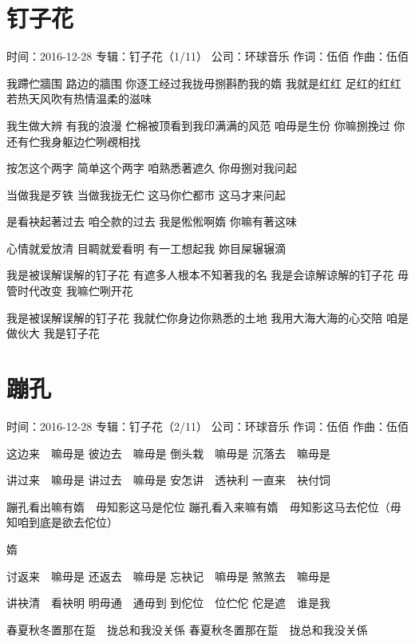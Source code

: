 \documentclass[UTF8,a4paper,oneside,twocolumn,12pt]{ctexbook}
\newcommand{\infopair}[2]{\textbullet #1：#2}
\newcommand{\zc}[1][伍佰]{\infopair{作词}{#1}}
\newcommand{\zq}[1][伍佰]{\infopair{作曲}{#1}}
\newcommand{\zj}[1]{\infopair{专辑}{#1}}
\newcommand{\sj}[1]{\infopair{时间}{#1}}
\newcommand{\gs}[1]{\infopair{公司}{#1}}
\newenvironment{info}{\begin{flushleft}\kaishu
	}
	{\end{flushleft}\normalsize\yahei\par}
\newenvironment{lyric}{
	}
{}
\begin{document}
\section{钉子花}
\begin{info}
	\sj{2016-12-28}
	\zj{钉子花（1/11）}
	\gs{环球音乐}
	\zc
	\zq
\end{info}
\begin{lyric}
	我蹛伫牆围 路边的牆围
	你逐工经过我拢毋捌斟酌我的媠
	我就是红红 足红的红红
	若热天风吹有热情温柔的滋味

	我生做大辨 有我的浪漫
	伫棉被顶看到我印满满的风范
	咱毋是生份 你嘛捌挽过
	你还有伫我身躯边伫咧覕相找

	按怎这个两字 简单这个两字
	咱熟悉著遮久 你毋捌对我问起

	当做我是歹铁 当做我拢无伫
	这马你伫都市 这马才来问起

	是看袂起著过去 咱仝款的过去
	我是倯倯啊媠 你嘛有著这味

	心情就爱放清 目睭就爱看明
	有一工想起我 妳目屎辗辗滴

	我是被误解误解的钉子花
	有遮多人根本不知著我的名
	我是会谅解谅解的钉子花
	毋管时代改变 我嘛伫咧开花

	我是被误解误解的钉子花
	我就伫你身边你熟悉的土地
	我用大海大海的心交陪
	咱是做伙大 我是钉子花
\end{lyric}

\section{蹦孔}
\begin{info}
	\sj{2016-12-28}
	\zj{钉子花（2/11）}
	\gs{环球音乐}
	\zc
	\zq
\end{info}
\begin{lyric}
	这边来　嘛毋是
	彼边去　嘛毋是
	倒头栽　嘛毋是
	沉落去　嘛毋是

	讲过来　嘛毋是
	讲过去　嘛毋是
	安怎讲　透袂利
	一直来　袂付饲

	蹦孔看出嘛有媠　毋知影这马是佗位
	蹦孔看入来嘛有媠　毋知影这马去佗位（毋知咱到底是欲去佗位）

	媠

	讨返来　嘛毋是
	还返去　嘛毋是
	忘袂记　嘛毋是
	煞煞去　嘛毋是

	讲袂清　看袂明
	明毋通　通毋到
	到佗位　位伫佗
	佗是遮　谁是我

	春夏秋冬置那在踅　拢总和我没关係
	春夏秋冬置那在踅　拢总和我没关係
\end{lyric}
\end{document}
